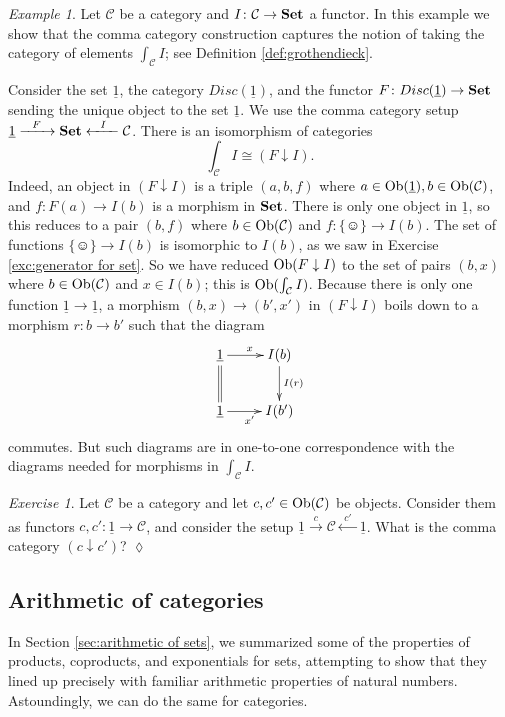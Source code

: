 \documentclass{book}
\def\tn{\textnormal}
\def\mc{\mathcal}
\def\Ob{\tn{Ob}}
\def\singleton{\{\smiley\}}
\def\to{\rightarrow}
\def\down{\downarrrow}
\def\taking{\colon}
\def\iso{\cong}
\def\down{\downarrow}
\def\ul{\underline}
\newcommand{\Too}[1]{\xrightarrow{\ \ #1\ \ }}
\newcommand{\Fromm}[1]{\xleftarrow{\ \ #1\ \ }}
\def\Set{{\bf Set}}
\def\mcC{\mc{C}}
\theoremstyle{remark}
\newtheorem{example}[subsubsection]{Example}
\newtheorem{exc}[subsubsection]{Exercise}
\newenvironment{exercise}{\begin{exc}}{\hspace*{\fill}$\lozenge$\end{exc}}
\theoremstyle{definition}
\begin{document}
\begin{example}

Let $\mcC$ be a category and $I\taking\mcC\to\Set$ a functor. In this example we show that the comma category construction captures the notion of taking the category of elements $\int_\mcC I$; see Definition \ref{def:grothendieck}. 

Consider the set $\ul{1}$, the category $Disc(\ul{1})$, and the functor $F\taking Disc(\ul{1})\to\Set$ sending the unique object to the set $\ul{1}$. We use the comma category setup $\ul{1}\Too{F}\Set\Fromm{I}\mcC$. There is an isomorphism of categories 
$$\int_\mcC I\iso (F\down I).$$
Indeed, an object in $(F\down I)$ is a triple $(a,b,f)$ where $a\in\Ob(\ul{1}), b\in\Ob(\mcC)$, and $f\taking F(a)\to I(b)$ is a morphism in $\Set$. There is only one object in $\ul{1}$, so this reduces to a pair $(b,f)$ where $b\in\Ob(\mcC)$ and $f\taking \singleton\to I(b)$. The set of functions $\singleton\to I(b)$ is isomorphic to $I(b)$, as we saw in Exercise \ref{exc:generator for set}. So we have reduced $\Ob(F\down I)$ to the set of pairs $(b,x)$ where $b\in\Ob(\mcC)$ and $x\in I(b)$; this is $\Ob(\int_\mcC I)$. Because there is only one function $\ul{1}\to\ul{1}$, a morphism $(b,x)\to(b',x')$ in $(F\down I)$ boils down to a morphism $r\taking b\to b'$ such that the diagram 
$$\xymatrix{\ul{1}\ar[r]^x\ar@{=}[d]&I(b)\ar[d]^{I(r)}\\\ul{1}\ar[r]_{x'}&I(b')}$$
commutes. But such diagrams are in one-to-one correspondence with the diagrams needed for morphisms in $\int_\mcC I$.

\end{example}

\begin{exercise}
Let $\mcC$ be a category and let $c,c'\in\Ob(\mcC)$ be objects. Consider them as functors $c,c'\taking\ul{1}\to\mcC$, and consider the setup $\ul{1}\Too{c}\mcC\Fromm{c'}\ul{1}$. What is the comma category $(c\down c')$?
\end{exercise}


\subsection{Arithmetic of categories}\label{sec:arithmetic of categories}

In Section \ref{sec:arithmetic of sets}, we summarized some of the properties of products, coproducts, and exponentials for sets, attempting to show that they lined up precisely with familiar arithmetic properties of natural numbers. Astoundingly, we can do the same for categories.
\end{document}
